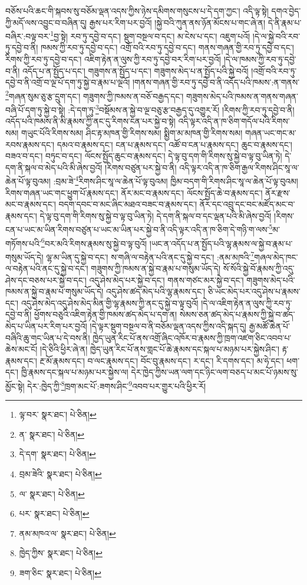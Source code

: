 བཅོས་པའི་ཆང་གི་སྐབས་སུ་བཅོམ་ལྡན་འདས་ཀྱིས་ཉེས་དམིགས་གསུངས་པ་དེ་དག་ཀྱང་། འདི་ལྟ་སྟེ། དགའ་བྱེད་ཀྱི་མདོ་ལས་འབྱུང་བ་བཞིན་དུ། རྒྱས་པར་རིག་པར་བྱའོ། །སྐྱེ་བའི་ཀུན་ནས་ཉོན་མོངས་པ་གང་ཞེ་ན། དེ་ནི་རྣམ་པ་བཞིར་:བལྟ་བར་\footnote{ལྟ་བར་  སྣར་ཐང་།  པེ་ཅིན། }བྱ་སྟེ། རབ་ཏུ་དབྱེ་བ་དང་། སྡུག་བསྔལ་བ་དང་། མ་ངེས་པ་དང་། འཇུག་པའོ། །དེ་ལ་སྐྱེ་བའི་རབ་ཏུ་དབྱེ་བ་ནི། ཁམས་ཀྱི་རབ་ཏུ་དབྱེ་བ་དང་། འགྲོ་བའི་རབ་ཏུ་དབྱེ་བ་དང་། གནས་གཞན་གྱི་རབ་ཏུ་དབྱེ་བ་དང་། རིགས་ཀྱི་རབ་ཏུ་དབྱེ་བ་དང་། འཇིག་རྟེན་ན་ལུས་ཀྱི་རབ་ཏུ་དབྱེ་བར་རིག་པར་བྱའོ། །དེ་ལ་ཁམས་ཀྱི་རབ་ཏུ་དབྱེ་བ་ནི། འདོད་པ་ན་སྤྱོད་པ་དང་། གཟུགས་ན་སྤྱོད་པ་དང་། གཟུགས་མེད་པ་ན་སྤྱོད་པའི་སྐྱེ་བའོ། །འགྲོ་བའི་རབ་ཏུ་དབྱེ་བ་ནི་འགྲོ་བ་ལྔ་པོ་དག་ཏུ་སྐྱེ་བ་རྣམ་པ་ལྔའོ། །གནས་གཞན་གྱི་རབ་ཏུ་དབྱེ་བ་ནི་འདོད་པའི་ཁམས་:ན་གནས་\footnote{ན་  སྣར་ཐང་།  པེ་ཅིན། }གཞན་སུམ་ཅུ་རྩ་དྲུག་དང་། གཟུགས་ཀྱི་ཁམས་ན་བཅོ་བརྒྱད་དང་། གཟུགས་མེད་པའི་ཁམས་ན་གནས་གཞན་བཞི་པོ་དག་ཏུ་སྐྱེ་བ་སྟེ། :དེ་དག་ཏུ་\footnote{དེ་དག་  སྣར་ཐང་།  པེ་ཅིན། }བསྡོམས་ན་སྐྱེ་བ་ལྔ་བཅུ་རྩ་བརྒྱད་དུ་འགྱུར་རོ། །རིགས་ཀྱི་རབ་ཏུ་དབྱེ་བ་ནི། འདོད་པའི་ཁམས་ནི་མི་རྣམས་ཀྱི་ནང་དུ་རིགས་ངན་པར་སྐྱེ་བ་སྟེ། འདི་ལྟར་འདི་ན་ཁ་ཅིག་གདོལ་པའི་རིགས་སམ། གཡུང་པོའི་རིགས་སམ། ཤིང་རྟ་མཁན་གྱི་རིགས་སམ། སྨྱིག་མ་མཁན་གྱི་རིགས་སམ། གཞན་ཡང་གང་མ་རབས་རྣམས་དང་། དམའ་བ་རྣམས་དང་། ངན་པ་རྣམས་དང་། འཚོ་བ་ངན་པ་རྣམས་དང་། ཆུང་བ་རྣམས་དང་། བཟའ་བ་དང་། བཏུང་བ་དང་། ལོངས་སྤྱོད་ཆུང་བ་རྣམས་དང་། དེ་ལྟ་བུ་དག་གི་རིགས་སུ་སྐྱེ་བ་ལྟ་བུ་ཡིན་ཏེ། དེ་དག་ནི་སྐལ་བ་མེད་པའི་མི་ཞེས་བྱའོ། །རིགས་བཙུན་པར་སྐྱེ་བ་ནི། འདི་ལྟར་འདི་ན་ཁ་ཅིག་རྒྱལ་རིགས་ཤིང་སཱ་ལ་ཆེན་པོ་ལྟ་བུའམ། :བྲམ་ཟེ་\footnote{བྲམ་ཟེའི་  སྣར་ཐང་།  པེ་ཅིན། }རིགས་ཤིང་སཱ་ལ་ཆེན་པོ་ལྟ་བུའམ། ཁྱིམ་བདག་གི་རིགས་ཤིང་སཱ་ལ་ཆེན་པོ་ལྟ་བུའམ། རིགས་གཞན་ཡང་གང་ཕྱུག་པོ་རྣམས་དང་། ནོར་མང་བ་རྣམས་དང་། ལོངས་སྤྱོད་ཆེ་བ་རྣམས་དང་། ནོར་རྫས་མང་བ་རྣམས་དང་། བདག་དབང་བ་མང་ཞིང་མཐའ་བཟང་བ་རྣམས་དང་། ནོར་དང་འབྲུ་དང་བང་མཛོད་མང་བ་རྣམས་དང་། དེ་ལྟ་བུ་དག་གི་རིགས་སུ་སྐྱེ་བ་ལྟ་བུ་ཡིན་ཏེ། དེ་དག་ནི་སྐལ་བ་དང་ལྡན་པའི་མི་ཞེས་བྱའོ། །རིགས་ངན་པ་ཡང་མ་ཡིན་རིགས་བཙུན་པ་ཡང་མ་ཡིན་པར་སྐྱེ་བ་ནི་འདི་ལྟར་འདི་ན་ཁ་ཅིག་དེ་གཉི་ག་ལས་\footnote{ལ་  སྣར་ཐང་།  པེ་ཅིན། }མ་གཏོགས་པའི་\footnote{པར་  སྣར་ཐང་།  པེ་ཅིན། }བར་མའི་རིགས་རྣམས་སུ་སྐྱེ་བ་ལྟ་བུའོ། །ཡང་ན་འདོད་པ་ན་སྤྱོད་པའི་ལྷ་རྣམས་ལ་སྐྱེ་བ་རྣམ་པ་གསུམ་ཡོད་དེ། ལྷ་མ་ཡིན་དུ་སྐྱེ་བ་དང་། ས་གཞི་ལ་བརྟེན་པའི་ནང་དུ་སྐྱེ་བ་དང་། :ནམ་མཁའི་\footnote{ནམ་མཁའ་ལ་  སྣར་ཐང་།  པེ་ཅིན། }གཞལ་མེད་ཁང་ལ་བརྟེན་པའི་ནང་དུ་སྐྱེ་བ་དང་། གཟུགས་ཀྱི་ཁམས་ན་སྐྱེ་བ་རྣམ་པ་གསུམ་ཡོད་དེ། སོ་སོའི་སྐྱེ་བོ་རྣམས་ཀྱི་འདུ་ཤེས་དང་བཅས་པར་སྐྱེ་བ་དང་། འདུ་ཤེས་མེད་པར་སྐྱེ་བ་དང་། གནས་གཙང་མར་སྐྱེ་བ་དང་། གཟུགས་མེད་པའི་ཁམས་ན་སྐྱེ་བ་རྣམ་པ་གསུམ་ཡོད་དེ། འདུ་ཤེས་ཚད་མེད་པའི་ལྷ་རྣམས་དང་། ཅི་ཡང་མེད་པར་འདུ་ཤེས་པ་རྣམས་དང་། འདུ་ཤེས་མེད་འདུ་ཤེས་མེད་མིན་གྱི་ལྷ་རྣམས་ཀྱི་ནང་དུ་སྐྱེ་བ་ལྟ་བུའོ། །དེ་ལ་འཇིག་རྟེན་ན་ལུས་ཀྱི་རབ་ཏུ་དབྱེ་བ་ནི། ཕྱོགས་བཅུའི་འཇིག་རྟེན་གྱི་ཁམས་ཚད་མེད་པ་དག་ན། སེམས་ཅན་ཚད་མེད་པ་རྣམས་ཀྱི་སྐྱེ་བ་ཚད་མེད་པ་ཡིན་པར་རིག་པར་བྱའོ། །དེ་ལྟར་སྡུག་བསྔལ་བ་ནི་བཅོམ་ལྡན་འདས་ཀྱིས་འདི་སྐད་དུ། རྒྱ་མཚོ་ཆེན་པོ་བཞིའི་ཆུ་གང་ཡིན་པ་དེ་བས་ནི། ཁྱེད་ཡུན་རིང་པོ་ནས་འགྲོ་ཞིང་འཁོར་བ་རྣམས་ཀྱི་ཁྲག་འཛག་ཅིང་འབབ་པ་ཆེས་མང་ངོ། །དེ་ཅིའི་ཕྱིར་ཞེ་ན། ཁྱེད་ཡུན་རིང་པོ་ནས་གླང་པོ་ཆེ་རྣམས་དང་སྐལ་པ་མཉམ་པར་སྐྱེས་ཤིང་། རྟ་རྣམས་དང་། རྔ་མོ་རྣམས་དང་། བ་ལང་རྣམས་དང་། བོང་བུ་རྣམས་དང་། ར་དང་། རི་དགས་དང་། མ་ཧེ་དང་། ཕག་དང་། ཁྱི་རྣམས་དང་སྐལ་པ་མཉམ་པར་སྐྱེས་ལ། དེར་ཁྱེད་ཀྱིས་ཡན་ལག་དང་ཉིང་ལག་བཅད་པ་མང་པོ་ཉམས་སུ་མྱོང་སྟེ། དེར་:ཁྱེད་ཀྱི་\footnote{ཁྱེད་ཀྱིས་  སྣར་ཐང་།  པེ་ཅིན། }ཁྲག་མང་པོ་:ཟགས་ཤིང་\footnote{ཟག་ཅིང་  སྣར་ཐང་།  པེ་ཅིན། }འབབ་པར་གྱུར་པའི་ཕྱིར་རོ། 